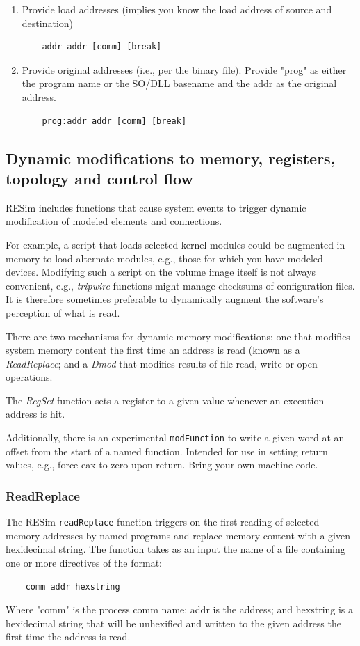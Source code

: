\documentclass[titlepage]{article}
\begin{document}
\begin{enumerate}
\item Provide load addresses (implies you know the load address of source and destination)
\begin{verbatim}
    addr addr [comm] [break]
\end{verbatim}
\item Provide original addresses (i.e., per the binary file).  Provide "prog" as either the
program name or the SO/DLL basename and the addr as the original address.
\begin{verbatim}
    prog:addr addr [comm] [break]
\end{verbatim}
\end{enumerate}

\subsection{Dynamic modifications to memory, registers, topology and control flow}
\label{dmod}
RESim includes functions that cause system events to trigger dynamic modification of modeled elements and connections.

For example, a script that loads selected kernel modules could be augmented in memory to
load alternate modules, e.g., those for which you have modeled devices.  Modifying such a script on the volume
image itself is not always convenient, e.g., \textit{tripwire} functions might manage checksums of
configuration files.  It is therefore sometimes preferable to dynamically augment the software's perception of what is read.

There are two mechanisms for dynamic memory modifications: one that modifies system memory content the first time an address is
read (known as a \textit{ReadReplace}; and a \textit{Dmod} that modifies results of file read, write or open operations.

The \textit{RegSet} function sets a register to a given value whenever an execution address is hit.

Additionally, there is an experimental {\tt modFunction} to write a given word at an offset from the start of a named function.  
Intended for use in setting return values, e.g., force eax to zero upon return.  Bring your own machine code.  

\subsubsection{ReadReplace}
\label{read-replace}
The RESim {\tt readReplace} function triggers on the first reading of selected memory addresses
by named programs and replace memory content with a given hexidecimal string.  The function takes as an
input the name of a file containing one or more directives of the format:
\begin{verbatim}
    comm addr hexstring
\end{verbatim}
Where "comm" is the process comm name; addr is the address; and hexstring
is a hexidecimal string that will be unhexified and written to the given
address the first time the address is read.
\end{document}
